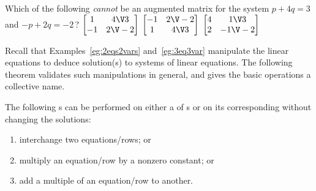\begin{activity}
Which of the following \emph{cannot} be an augmented matrix for the system \(p+4q=3\) and \(-p+2q=-2\)\,?
{\(\begin{bmatrix} 1&4\V3\\-1&2\V-2 \end{bmatrix}\)}
{\(\begin{bmatrix} -1&2\V-2\\1&4\V3 \end{bmatrix}\)}
{\(\begin{bmatrix} 4&1\V3\\2&-1\V-2 \end{bmatrix}\)}
\end{activity}





Recall that Examples~\ref{eg:2eqs2vars} and~\ref{eg:3eq3var} manipulate the linear equations to deduce solution(s) to systems of linear equations.
The following theorem validates such manipulations in general, and gives the basic operations a collective name. 


\begin{theorem} \label{thm:erowop} 
The following s can be performed on either a  of s or on its corresponding  without changing the solutions:
\begin{enumerate}
\item {}interchange two equations\slash rows; or
\item multiply an equation\slash row by a nonzero constant; or
\item add a multiple of an equation\slash row to another.
\end{enumerate}
\end{theorem}

